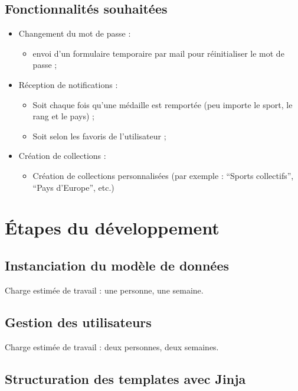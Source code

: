 \documentclass[12pt]{article}
\begin{document}
	\subsection{Fonctionnalités souhaitées}
	
	\begin{itemize}
		\item Changement du mot de passe :
		\begin{itemize}
			\item envoi d'un formulaire temporaire par mail pour réinitialiser le mot de passe ;
		\end{itemize}
		\item Réception de notifications :
		\begin{itemize}
			\item Soit chaque fois qu'une médaille est remportée (peu importe le sport, le rang et le pays) ;
			\item Soit selon les favoris de l'utilisateur ;
		\end{itemize}
		\item Création de collections :
		\begin{itemize}
			\item Création de collections personnalisées (par exemple : \enquote{Sports collectifs}, \enquote{Pays d'Europe}, etc.)
		\end{itemize}
	\end{itemize}
	
	\section{Étapes du développement}
	
	\subsection*{Instanciation du modèle de données}
	
	Charge estimée de travail : une personne, une semaine.
	
	\subsection*{Gestion des utilisateurs}
	
	Charge estimée de travail : deux personnes, deux semaines.
	
	\subsection*{Structuration des templates avec Jinja}
	
\end{document}
